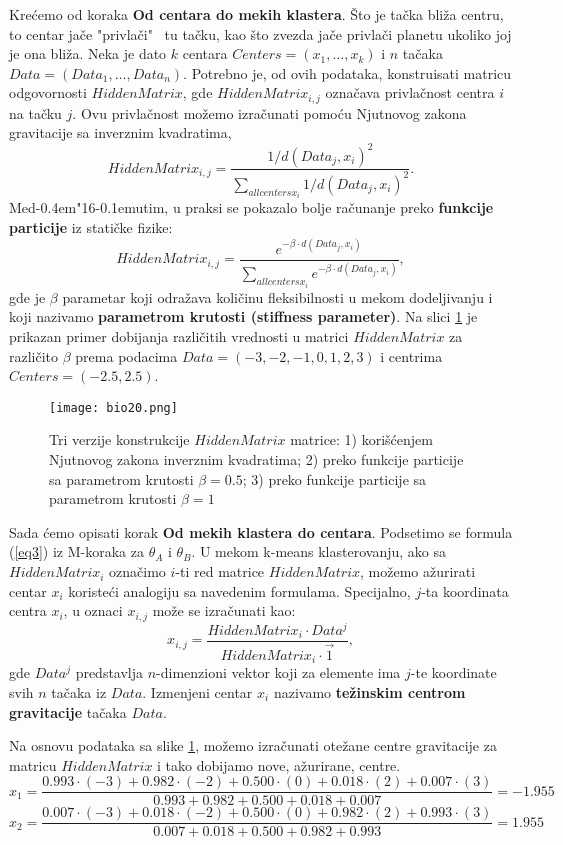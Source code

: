 \documentclass[a4paper]{book}
\def \dj {d\kern-0.4em\char"16\kern-0.1em}
\begin{document}
Krećemo od koraka \textbf{Od centara do mekih klastera}. Što je tačka bliža centru, to centar jače "privlači" \ tu tačku, kao što zvezda jače privlači planetu ukoliko joj je ona bliža. Neka je dato $k$ centara $Centers = (x_1, \dots, x_k)$ i $n$ tačaka $Data = (Data_1, \dots, Data_n)$. Potrebno je, od ovih podataka, konstruisati matricu odgovornosti $HiddenMatrix$, gde $HiddenMatrix_{i,j}$ označava privlačnost centra $i$ na tačku $j$. %
Ovu privlačnost možemo izračunati pomoću Njutnovog zakona gravitacije sa inverznim kvadratima,
$$HiddenMatrix_{i,j} = \frac{1/d(Data_j, x_i)^2}{\sum_{all centers x_i} 1/d(Data_j, x_i)^2}.$$
Me\dj utim, u praksi se pokazalo bolje računanje preko \textbf{funkcije particije} iz statičke fizike:
$$HiddenMatrix_{i,j} = \frac{e^{-\beta \cdot d(Data_j, x_i)}}{\sum_{all centers x_i} e^{-\beta \cdot d(Data_j, x_i)}},$$
gde je $\beta$ parametar koji odražava količinu fleksibilnosti u mekom dodeljivanju i koji nazivamo \textbf{parametrom krutosti (stiffness parameter)}. Na slici \ref{slika 20} je prikazan primer dobijanja različitih vrednosti u matrici $HiddenMatrix$ za različito $\beta$ prema podacima $Data = (-3,-2,-1,0,1,2,3)$ i centrima $Centers = (-2.5,2.5)$.
	

\begin{figure}
    \centering
    \texttt{[image: bio20.png]}
    \caption{Tri verzije konstrukcije $HiddenMatrix$ matrice: 1) korišćenjem Njutnovog zakona inverznim kvadratima; 2) preko funkcije particije sa parametrom krutosti $\beta = 0.5$; 3) preko funkcije particije sa parametrom krutosti $\beta = 1$}
    \label{slika 20}
\end{figure}

Sada ćemo opisati korak \textbf{Od mekih klastera do centara}. Podsetimo se formula (\ref{eq3}) iz M-koraka za $\theta_A$ i $\theta_B$.
U mekom k-means klasterovanju, ako sa $HiddenMatrix_i$ označimo $i$-ti red matrice $HiddenMatrix$, možemo ažurirati centar $x_i$ koristeći analogiju sa navedenim formulama.
Specijalno, $j$-ta koordinata centra $x_i$, u oznaci $x_{i,j}$ može se izračunati kao:
$$x_{i,j} = \frac{HiddenMatrix_i \cdot Data^j}{HiddenMatrix_i \cdot \overrightarrow{1}},$$
gde $Data^j$ predstavlja $n$-dimenzioni vektor koji za elemente ima $j$-te koordinate svih $n$ tačaka iz $Data$. Izmenjeni centar $x_i$	nazivamo \textbf{težinskim centrom gravitacije} tačaka $Data$.

Na osnovu podataka sa slike \ref{slika 20}, možemo izračunati otežane centre gravitacije za matricu $HiddenMatrix$ i tako dobijamo nove, ažurirane, centre.
$$x_1 = \frac{0.993 \cdot (-3) + 0.982 \cdot (-2) + 0.500 \cdot (0) + 0.018 \cdot (2) + 0.007 \cdot (3)}{0.993 + 0.982 + 0.500 + 0.018 + 0.007} = -1.955$$
$$x_2 = \frac{0.007 \cdot (-3) + 0.018 \cdot (-2) + 0.500 \cdot (0) + 0.982 \cdot (2) + 0.993 \cdot (3)}{0.007 + 0.018 + 0.500 + 0.982 + 0.993} = 1.955$$	
	
\end{document}

